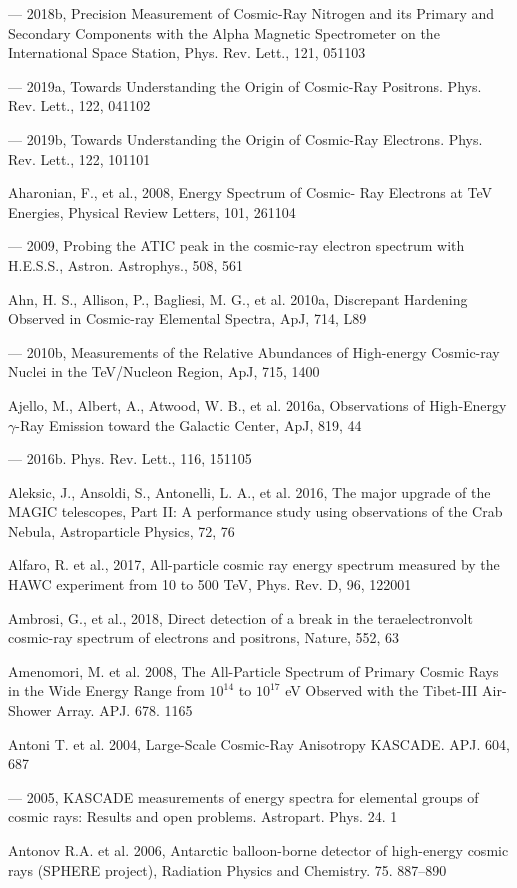 --- 2018b, Precision Measurement of Cosmic-Ray Nitrogen and its Primary and Secondary Components with the Alpha Magnetic Spectrometer on the International Space Station, Phys. Rev. Lett., 121, 051103

--- 2019a, Towards Understanding the Origin of Cosmic-Ray Positrons. Phys. Rev. Lett., 122, 041102

--- 2019b, Towards Understanding the Origin of Cosmic-Ray Electrons. Phys. Rev. Lett., 122, 101101

Aharonian, F., et al., 2008, Energy Spectrum of Cosmic- Ray Electrons at TeV Energies, Physical Review Letters, 101, 261104

--- 2009, Probing the ATIC peak in the cosmic-ray electron spectrum with H.E.S.S., Astron. Astrophys., 508, 561 

Ahn, H. S., Allison, P., Bagliesi, M. G., et al. 2010a, Discrepant Hardening Observed in Cosmic-ray Elemental Spectra, ApJ, 714, L89

--- 2010b, Measurements of the Relative Abundances of High-energy Cosmic-ray Nuclei in the TeV/Nucleon Region, ApJ, 715, 1400

Ajello, M., Albert, A., Atwood, W. B., et al. 2016a, \fermilat{} Observations of High-Energy $\gamma$-Ray Emission toward the Galactic Center, ApJ, 819, 44

--- 2016b. Phys. Rev. Lett., 116, 151105

Aleksic, J., Ansoldi, S., Antonelli, L. A., et al. 2016, The major upgrade of the MAGIC telescopes, Part II: A performance study using observations of the Crab Nebula, Astroparticle Physics, 72, 76

Alfaro, R. et al., 2017, All-particle cosmic ray energy spectrum measured by the HAWC experiment from 10 to 500 TeV, Phys. Rev. D, 96, 122001

Ambrosi, G., et al., 2018, Direct detection of a break in the teraelectronvolt cosmic-ray spectrum of electrons and positrons, Nature, 552, 63

Amenomori, M. et al. 2008, The All-Particle Spectrum of Primary Cosmic Rays in the Wide Energy Range from $10^{14}$ to $10^{17}$ eV Observed with the Tibet-III Air-Shower Array. APJ. 678. 1165

Antoni T. et al. 2004, Large-Scale Cosmic-Ray Anisotropy KASCADE. APJ. 604, 687

--- 2005, KASCADE measurements of energy spectra for elemental groups of cosmic rays: Results and open problems. Astropart. Phys. 24. 1

Antonov R.A. et al. 2006, Antarctic balloon-borne detector of high-energy cosmic rays (SPHERE project), Radiation Physics and Chemistry. 75. 887--890

